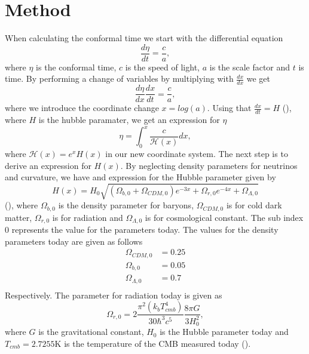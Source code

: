 \documentclass[onecolumn]{aastex62}
\begin{document}
\section{Method} \label{sec:method}
When calculating the conformal time we start with the differential equation
\begin{equation}
    \frac{d\eta}{dt} = \frac{c}{a},
\end{equation}
where $\eta$ is the conformal time, $c$ is the speed of light, $a$ is the scale
factor and $t$ is time. By performing a change of variables by multiplying with
$\frac{dx}{dx}$ we get
\begin{equation}
    \frac{d\eta}{dx}\frac{dx}{dt} = \frac{c}{a},
\end{equation}
where we introduce the coordinate change $x=log(a)$. Using that
$\frac{dx}{dt}=H$ (\cite{callin2006calculate}), where $H$ is the hubble paramater, we get an expression for $\eta$
\begin{equation}\label{eq:eta_of_x}
    \eta = \int_{0}^{x}\frac{c}{\mathcal{H}(x)}dx,
\end{equation}
where $\mathcal{H}(x)=e^xH(x)$ in our new coordinate system. The next step is to
derive an expression for $H(x)$. By neglecting density parameters for neutrinos
and curvature, we have and expression for the Hubble parameter given by
\begin{equation}\label{eq:H_of_x}
    H(x) = H_0\sqrt{(\Omega_{b,0} + \Omega_{CDM,0})e^{-3x} + \Omega_{r,0} e^{-4x} + \Omega_{\Lambda,0}}
\end{equation} 
(\cite{Winther:2020}), where $\Omega_{b,0}$ is the density parameter for baryons,
$\Omega_{CDM,0}$ is for cold dark matter, $\Omega_{r,0}$ is for radiation and
$\Omega_{\Lambda,0}$ is for cosmological constant. The sub index $0$ represents
the value for the parameters today. The values for the density parameters today
are given as follows
\begin{align}
    \Omega_{CDM,0} &=0.25\\
    \Omega_{b,0} &=0.05\\
    \Omega_{\Lambda,0} &=0.7\\
\end{align}
Respectively. The parameter for radiation today is given as 
\begin{equation}
    \Omega_{r,0} =2\frac{\pi^2(k_bT_{cmb}^4)}{30\hbar^3c^5}\frac{8\pi G}{3H_0^2},
\end{equation}
where $G$ is the gravitational constant, $H_0$ is the Hubble parameter today and
$T_{cmb} =2.7255$K is the temperature of the CMB measured today (\cite{Winther:2020}).
 
\end{document}
